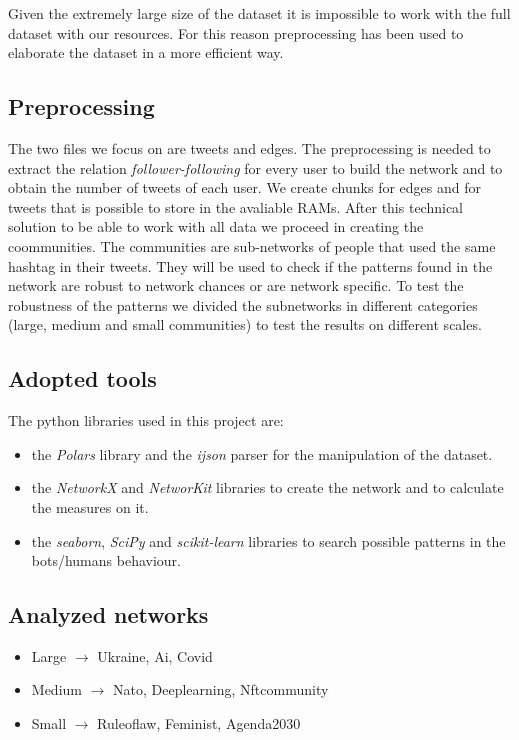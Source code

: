 \documentclass[12pt, a4paper]{article}
\begin{document}
	Given the extremely large size of the dataset it is impossible to work with the full dataset with our resources. For this reason preprocessing has been used to elaborate the dataset in a more efficient way.
    \vspace{0.1cm}

        \subsection{Preprocessing}
        The two files we focus on are tweets and edges. The preprocessing is needed to extract the relation \textit{follower-following} for every user to build the network and to obtain the number of tweets of each user.
        \vspace{0.1cm}
        We create chunks for edges and for tweets that is possible to store in the avaliable RAMs.
        \vspace{0.1cm}
        After this technical solution to be able to work with all data we proceed in creating the coommunities. The communities are sub-networks of people that used the same hashtag in their tweets. They will be used to check if the patterns found in the network are robust to network chances or are network specific. To test the robustness of the patterns we divided the subnetworks in different categories (large, medium and small communities) to test the results on different scales.
	
	\subsection{Adopted tools}
		The python libraries used in this project are:
        \begin{itemize}
            \item the \textit{Polars} library and the \textit{ijson} parser for the manipulation of the dataset.
            \item the \textit{NetworkX} and \textit{NetworKit} libraries to create the network and to calculate the measures on it.
            \item the \textit{seaborn}, \textit{SciPy} and \textit{scikit-learn} libraries to search possible patterns in the bots/humans behaviour.
        \end{itemize}
		
		
	\subsection{Analyzed networks}
		\begin{itemize}
			\item Large $\rightarrow$ Ukraine, Ai, Covid
			\item Medium $\rightarrow$ Nato, Deeplearning, Nftcommunity
			\item Small $\rightarrow$ Ruleoflaw, Feminist, Agenda2030
		\end{itemize}
\end{document}
